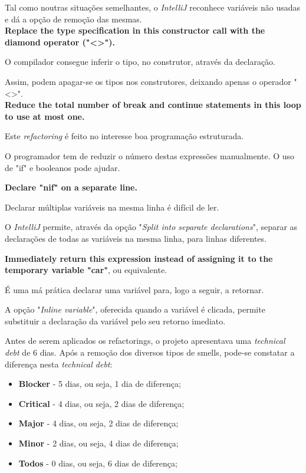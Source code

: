 \documentclass[a4paper]{report}
\begin{document}
\begin{itemize}
    Tal como noutras situações semelhantes, o \textit{IntelliJ} reconhece variáveis não usadas e dá a opção de remoção das mesmas. \\


    \textbf{Replace the type specification in this constructor call with the diamond operator ("<>").}

    O compilador consegue inferir o tipo, no construtor, através da declaração.

    Assim, podem apagar-se os tipos nos construtores, deixando apenas o operador "<>". \\


    \textbf{Reduce the total number of break and continue statements in this loop to use at most one.}

    Este \textit{refactoring} é feito no interesse boa programação estruturada.

    O programador tem de reduzir o número destas expressões manualmente. O uso de "if" e booleanos pode ajudar.


    \textbf{Declare "nif" on a separate line.}

    Declarar múltiplas variáveis na mesma linha é difícil de ler.

    O \textit{IntelliJ} permite, através da opção "\textit{Split into separate declarations}", separar as declarações de todas as variáveis na mesma linha, para linhas diferentes.


    \textbf{Immediately return this expression instead of assigning it to the temporary variable "car"}, ou equivalente.

    É uma má prática declarar uma variável para, logo a seguir, a retornar.

    A opção "\textit{Inline variable}", oferecida quando a variável é clicada, permite substituir a declaração da variável pelo seu retorno imediato.
\end{itemize}

Antes de serem aplicados os refactorings, o projeto apresentava uma \textit{technical debt} de 6 dias.
Após a remoção dos diversos tipos de smells, pode-se constatar a diferença nesta \textit{technical debt}:
\begin{itemize}
    \item \textbf{Blocker} - 5 dias, ou seja, 1 dia de diferença;
    \item \textbf{Critical} - 4 dias, ou seja, 2 dias de diferença;
    \item \textbf{Major} - 4 dias, ou seja, 2 dias de diferença;
    \item \textbf{Minor} - 2 dias, ou seja, 4 dias de diferença;
    \item \textbf{Todos} - 0 dias, ou seja, 6 dias de diferença;
\end{itemize}
\end{document}
